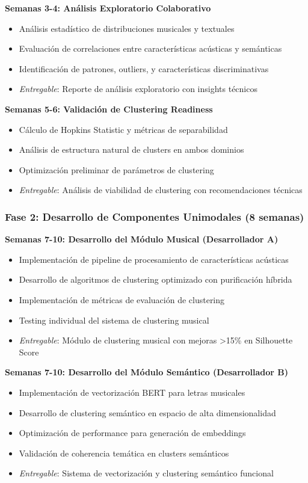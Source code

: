 \documentclass[12pt,a4paper]{article}
\begin{document}
\textbf{Semanas 3-4: Análisis Exploratorio Colaborativo}
\begin{itemize}
    \item Análisis estadístico de distribuciones musicales y textuales
    \item Evaluación de correlaciones entre características acústicas y semánticas
    \item Identificación de patrones, outliers, y características discriminativas
    \item \textit{Entregable}: Reporte de análisis exploratorio con insights técnicos
\end{itemize}

\textbf{Semanas 5-6: Validación de Clustering Readiness}
\begin{itemize}
    \item Cálculo de Hopkins Statistic y métricas de separabilidad
    \item Análisis de estructura natural de clusters en ambos dominios
    \item Optimización preliminar de parámetros de clustering
    \item \textit{Entregable}: Análisis de viabilidad de clustering con recomendaciones técnicas
\end{itemize}

\subsubsection{Fase 2: Desarrollo de Componentes Unimodales (8 semanas)}

\textbf{Semanas 7-10: Desarrollo del Módulo Musical (Desarrollador A)}
\begin{itemize}
    \item Implementación de pipeline de procesamiento de características acústicas
    \item Desarrollo de algoritmos de clustering optimizado con purificación híbrida
    \item Implementación de métricas de evaluación de clustering
    \item Testing individual del sistema de clustering musical
    \item \textit{Entregable}: Módulo de clustering musical con mejoras >15\% en Silhouette Score
\end{itemize}

\textbf{Semanas 7-10: Desarrollo del Módulo Semántico (Desarrollador B)}
\begin{itemize}
    \item Implementación de vectorización BERT para letras musicales
    \item Desarrollo de clustering semántico en espacio de alta dimensionalidad
    \item Optimización de performance para generación de embeddings
    \item Validación de coherencia temática en clusters semánticos
    \item \textit{Entregable}: Sistema de vectorización y clustering semántico funcional
\end{itemize}
\end{document}
